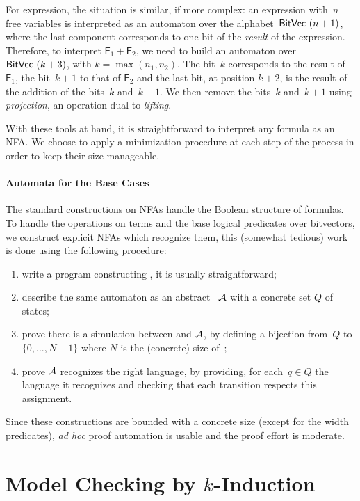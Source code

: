 For expression, the situation is similar, if more complex: an expression
with~$n$ free variables is interpreted as an automaton over the
alphabet~$\mathsf{BitVec}~{(n+1)}$, where the last component corresponds to one bit of the
\emph{result} of the expression.
%
Therefore, to interpret $\mathsf E_1 + \mathsf E_2$, we need to build an
automaton over~$\mathsf{BitVec}~{(k+3)}$, with $k = \max(n_1, n_2)$.
%
The bit~$k$ corresponds to the result of~$\mathsf E_1$, the bit~$k+1$ to that of
$\mathsf E_2$ and the last bit, at position $k+2$, is the result of the addition
of the bits~$k$ and~$k+1$.
%
We then remove the bits~$k$ and~$k+1$ using \emph{projection}, an operation dual
to \emph{lifting}.

With these tools at hand, it is straightforward to interpret any formula as an
NFA. We choose to apply a minimization procedure at each step of the process
in order to keep their size manageable.

\paragraph{Automata for the Base Cases}

The standard constructions on NFAs handle the Boolean structure of formulas.
%
To handle the operations on terms and the base logical predicates over
bitvectors, we construct explicit NFAs which recognize them, this (somewhat
tedious) work is done using the following procedure:
\begin{enumerate}
  \item write a program constructing , it is usually
    straightforward;
  \item describe the same automaton as an abstract ~$\mathcal{A}$ with
    a concrete set $Q$ of states;
  \item prove there is a simulation between  and $\mathcal{A}$, by
    defining a bijection from~$Q$ to $\{0, ..., N-1\}$ where $N$ is the
    (concrete) size of~;
  \item prove $\mathcal{A}$ recognizes the right language, by providing, for each~$q
    \in Q$ the language it recognizes and checking that each transition respects
    this assignment.
\end{enumerate}
%
Since these constructions are bounded with a concrete size (except for the width
predicates), \emph{ad hoc} proof automation is usable and the proof effort is
moderate.

\section{Model Checking by \texorpdfstring{$k$}{k}-Induction}
\label{sec:swbv:kinduction}

